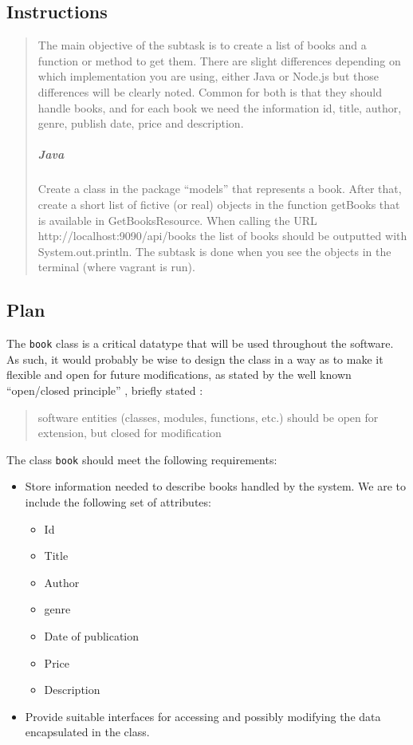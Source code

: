 \subsection{Instructions}\label{task-1a-instructions}

\begin{quote}
  The main objective of the subtask is to create a list of books and a function
  or method to get them. There are slight differences depending on which
  implementation you are using, either Java or Node.js but those differences
  will be clearly noted. Common for both is that they should handle books,
  and for each book we need the information id, title, author, genre, publish
  date, price and description.

  \subparagraph{Java}
  Create a class in the package ``models'' that represents a book. After
  that, create a short list of fictive (or real) objects in the function
  getBooks that is available in GetBooksResource. When calling the URL
  http://localhost:9090/api/books the list of books should be outputted
  with System.out.println. The subtask is done when you see the objects in
  the terminal (where vagrant is run).
\end{quote}


\subsection{Plan}\label{task-1a-plan}
The \texttt{book} class is a critical datatype that will be used throughout the
software. As such, it would probably be wise to design the class in a way as 
to make it flexible and open for future modifications, as stated by the well known
``open/closed principle'' \cite{SOLID:OCP}, briefly stated \cite{SOLID:OCP:Meyer}:

\begin{quote}
  software entities (classes, modules, functions, etc.) should be open for
  extension, but closed for modification
\end{quote}


The class \texttt{book} should meet the following requirements:

\begin{itemize}
\tightlist
  \item Store information needed to describe books handled by the system.
        We are to include the following set of attributes:

  \begin{itemize}
    \tightlist
    \item Id
    \item Title
    \item Author
    \item genre
    \item Date of publication
    \item Price
    \item Description
  \end{itemize}

  \item Provide suitable interfaces for accessing and possibly modifying the 
        data encapsulated in the class.
\end{itemize}


